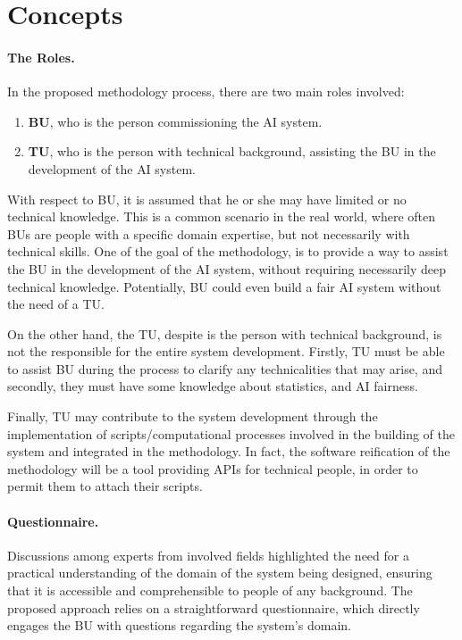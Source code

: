 \documentclass[12pt,a4paper,openright,twoside]{book}
\begin{document}
\section{Concepts}

\paragraph{The Roles.}
In the proposed methodology process, there are two main roles involved:
\begin{enumerate}
    \item \textbf{\ac{BU}},
    who is the person commissioning the \ac{AI} system.
    \item \textbf{\ac{TU}}, who is the person with technical background, assisting the \ac{BU} in the development of the \ac{AI} system.
\end{enumerate}

With respect to \ac{BU}, it is assumed that he or she may have limited or no technical knowledge.
%
This is a common scenario in the real world, where often \acp{BU} are people with a specific domain expertise, but not necessarily with technical skills.
%
One of the goal of the methodology, is to provide a way to assist the \ac{BU} in the development of the \ac{AI} system, without requiring necessarily deep technical knowledge.
%
Potentially, \ac{BU} could even build a fair \ac{AI} system without the need of a \ac{TU}.

On the other hand, the \acl{TU}, despite is the person with technical background, is not the responsible for the entire system development.
%
Firstly, \ac{TU} must be able to assist \ac{BU} during the process to clarify any technicalities that may arise, and secondly, 
they must have some knowledge about statistics, and \ac{AI} fairness.

Finally, \ac{TU} may contribute to the system development through the implementation of scripts/computational processes involved in the building of the system and integrated in the methodology.
%
In fact, the software reification of the methodology will be a tool providing \acp{API} for technical people, in order to permit them to attach their scripts.


\paragraph{Questionnaire.}
Discussions among experts from involved fields highlighted the need for a practical understanding of the domain of the system being designed, ensuring that it is accessible and comprehensible to people of any background.
%
The proposed approach relies on a straightforward questionnaire, which directly engages the \acl{BU} with questions regarding the system's domain.
\end{document}
